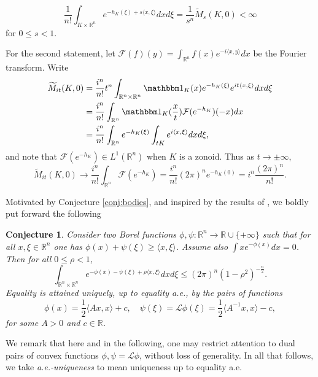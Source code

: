 \documentclass[reqno,10pt]{amsart}
\newcounter{mp}
\newtheorem{Conjecture}[Proposition]{Conjecture}
\newcommand{\R}{\mathbb{R}}
\begin{document}
 $$\frac{1}{n!}\int_{K\times\R^n} e^{-h_K(\xi)+s\langle x,\xi\rangle }dxd\xi =\frac{1}{s^n}\widetilde M_s(K,0)<\infty$$
for $0\leq s<1$.

For the second statement, let $\mathcal F(f)(y)=\int_{\R^n}f(x)e^{-i\langle x, y\rangle }dx$ be the Fourier transform. Write 
\begin{align*}\widetilde M_{it}(K,0)&=\frac{i^n}{n!} t^n\int_{\R^n\times\R^n}\mathbbm 1_K(x) e^{-h_K(\xi)}e^{it\langle x, \xi\rangle}dxd\xi\\&=\frac{i^n}{n!}\int_{\R^n} \mathbbm 1_K(\frac{x}{t})\mathcal F(e^{-h_K})(-x)dx\\&=\frac{i^n}{n!}\int_{\R^n}e^{-h_K(\xi)}\int_{tK}e^{i\langle x,\xi\rangle} dxd\xi ,\end{align*}
and note that $\mathcal F(e^{-h_K})\in L^1(\R^n)$ when $K$ is a zonoid. Thus as $t\to\pm \infty$, 
$$ \widetilde M_{it}(K,0)\to \frac{i^n}{n!}\int_{\R^n}\mathcal F(e^{-h_K})=\frac{i^n}{n!}(2\pi)^ne^{-h_K(0)}=i^n\frac{(2\pi)^n}{n!}.$$
 \endproof
 
Motivated by Conjecture \ref{conj:bodies}, and inspired by the results of \cite{lehec}, we boldly put forward the following
\begin{Conjecture}\label{conj:functional_general}
	Consider two Borel functions $\phi,\psi:\R^n\to \R\cup\{+\infty\}$ such that for all $x,\xi\in\R^n$ one has $\phi(x)+\psi(\xi)\geq \langle x, \xi\rangle $. Assume also $\int xe^{-\phi(x)}dx=0$. Then for all $0\leq \rho<1$, 
		\begin{equation}\label{eq:general_inequality} \int_{\R^n\times\R^n}e^{-\phi(x)-\psi(\xi)+\rho\langle x,\xi\rangle}dxd\xi\leq (2\pi)^n(1-\rho^2)^{-\frac n 2}.\end{equation}
	Equality is attained uniquely, up to equality a.e., by the pairs of functions
	\begin{equation}\label{eq:pairs}\phi(x)=\frac 12 \langle Ax, x\rangle +c, \quad \psi(\xi)=\mathcal L\phi(\xi)=\frac 12 \langle A^{-1}x, x\rangle -c,\end{equation}
	for some $A>0$ and $c\in\R$.
\end{Conjecture}
We remark that here and in the following, one may restrict attention to dual pairs of convex functions $\phi, \psi=\mathcal L\phi$, without loss of generality.
In all that follows, we take \emph{a.e.-uniqueness} to mean uniqueness up to equality a.e.
\end{document}
